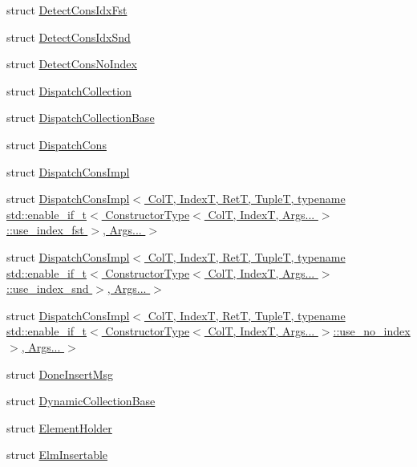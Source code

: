 \begin{DoxyCompactItemize}
struct \hyperlink{structvt_1_1vrt_1_1collection_1_1_detect_cons_idx_fst}{Detect\+Cons\+Idx\+Fst}
\item 
struct \hyperlink{structvt_1_1vrt_1_1collection_1_1_detect_cons_idx_snd}{Detect\+Cons\+Idx\+Snd}
\item 
struct \hyperlink{structvt_1_1vrt_1_1collection_1_1_detect_cons_no_index}{Detect\+Cons\+No\+Index}
\item 
struct \hyperlink{structvt_1_1vrt_1_1collection_1_1_dispatch_collection}{Dispatch\+Collection}
\item 
struct \hyperlink{structvt_1_1vrt_1_1collection_1_1_dispatch_collection_base}{Dispatch\+Collection\+Base}
\item 
struct \hyperlink{structvt_1_1vrt_1_1collection_1_1_dispatch_cons}{Dispatch\+Cons}
\item 
struct \hyperlink{structvt_1_1vrt_1_1collection_1_1_dispatch_cons_impl}{Dispatch\+Cons\+Impl}
\item 
struct \hyperlink{structvt_1_1vrt_1_1collection_1_1_dispatch_cons_impl_3_01_col_t_00_01_index_t_00_01_ret_t_00_01_54a52467cad1298e4d5e26941719b8e5}{Dispatch\+Cons\+Impl$<$ Col\+T, Index\+T, Ret\+T, Tuple\+T, typename std\+::enable\+\_\+if\+\_\+t$<$ Constructor\+Type$<$ Col\+T, Index\+T, Args... $>$\+::use\+\_\+index\+\_\+fst $>$, Args... $>$}
\item 
struct \hyperlink{structvt_1_1vrt_1_1collection_1_1_dispatch_cons_impl_3_01_col_t_00_01_index_t_00_01_ret_t_00_01_dd689f23c5fa7346ae8a5efd9cf9f29e}{Dispatch\+Cons\+Impl$<$ Col\+T, Index\+T, Ret\+T, Tuple\+T, typename std\+::enable\+\_\+if\+\_\+t$<$ Constructor\+Type$<$ Col\+T, Index\+T, Args... $>$\+::use\+\_\+index\+\_\+snd $>$, Args... $>$}
\item 
struct \hyperlink{structvt_1_1vrt_1_1collection_1_1_dispatch_cons_impl_3_01_col_t_00_01_index_t_00_01_ret_t_00_01_7bb06b6d2cbf7ddb7e46d39f1adc61e1}{Dispatch\+Cons\+Impl$<$ Col\+T, Index\+T, Ret\+T, Tuple\+T, typename std\+::enable\+\_\+if\+\_\+t$<$ Constructor\+Type$<$ Col\+T, Index\+T, Args... $>$\+::use\+\_\+no\+\_\+index $>$, Args... $>$}
\item 
struct \hyperlink{structvt_1_1vrt_1_1collection_1_1_done_insert_msg}{Done\+Insert\+Msg}
\item 
struct \hyperlink{structvt_1_1vrt_1_1collection_1_1_dynamic_collection_base}{Dynamic\+Collection\+Base}
\item 
struct \hyperlink{structvt_1_1vrt_1_1collection_1_1_element_holder}{Element\+Holder}
\item 
struct \hyperlink{structvt_1_1vrt_1_1collection_1_1_elm_insertable}{Elm\+Insertable}

\end{DoxyCompactItemize}
